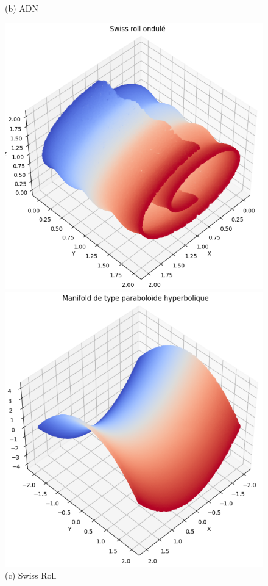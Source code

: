 \documentclass[unnumsec,webpdf,modern,large]{projet_manifold}%
\theoremstyle{thmstyleone}%
\theoremstyle{thmstyletwo}%
\theoremstyle{thmstylethree}%
\begin{document}
\begin{figure}[t]
\begin{minipage}{0.19\textwidth}
        \caption*{(b) ADN }
    \end{minipage}%
    \hfill
    \begin{minipage}{0.19\textwidth}
        \includegraphics[width=\linewidth]{Fig/swiss_roll_ondule.png}
        \caption*{(c) Swiss Roll}
    \end{minipage}%
    \hfill
    \begin{minipage}{0.19\textwidth}
        \includegraphics[width=\linewidth]{Fig/selle.png}

\end{minipage}
\end{figure}
\end{document}
